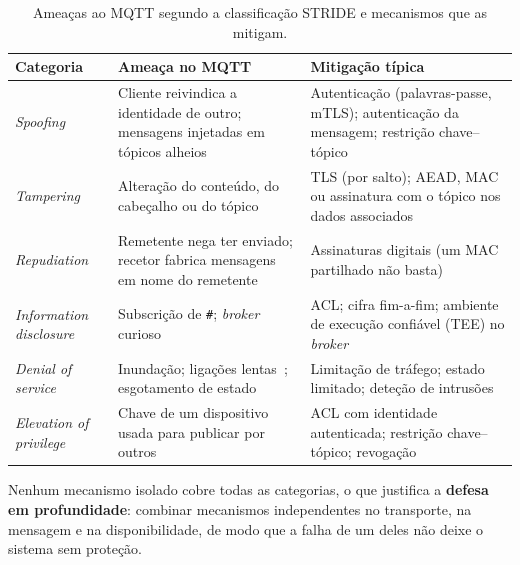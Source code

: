 \begin{table}[ht]
  \centering
  \caption{Ameaças ao MQTT segundo a classificação STRIDE e mecanismos que as mitigam.}
  \label{tab:stride}
  \small
  \begin{tabularx}{\textwidth}{@{}L{2.4cm}L{5.2cm}Y@{}}
    \toprule
    \textbf{Categoria} & \textbf{Ameaça no MQTT} & \textbf{Mitigação típica} \\
    \midrule
    \emph{Spoofing}    & Cliente reivindica a identidade de outro; mensagens injetadas em tópicos alheios
                       & Autenticação (palavras-passe, mTLS); autenticação da mensagem; restrição chave--tópico \\
    \emph{Tampering}   & Alteração do conteúdo, do cabeçalho ou do tópico
                       & TLS (por salto); AEAD, MAC ou assinatura com o tópico nos dados associados \\
    \emph{Repudiation} & Remetente nega ter enviado; recetor fabrica mensagens em nome do remetente
                       & Assinaturas digitais (um MAC partilhado não basta) \\
    \emph{Information disclosure} & Subscrição de \texttt{\#}; \emph{broker} curioso
                       & ACL; cifra fim-a-fim; ambiente de execução confiável (TEE) no \emph{broker}~\cite{segarra2020mqttz} \\
    \emph{Denial of service} & Inundação; ligações lentas~\cite{vaccari2020slowite}; esgotamento de estado
                       & Limitação de tráfego; estado limitado; deteção de intrusões~\cite{vaccari2020mqttset} \\
    \emph{Elevation of privilege} & Chave de um dispositivo usada para publicar por outros
                       & ACL com identidade autenticada; restrição chave--tópico; revogação \\
    \bottomrule
  \end{tabularx}
\end{table}

Nenhum mecanismo isolado cobre todas as categorias, o que justifica a
\textbf{defesa em profundidade}: combinar mecanismos independentes no transporte, na
mensagem e na disponibilidade, de modo que a falha de um deles não deixe o sistema
sem proteção.
